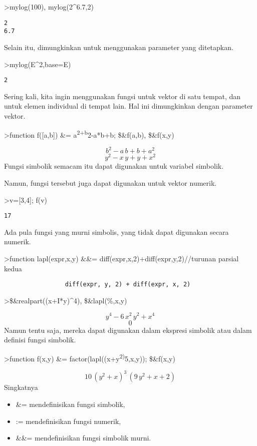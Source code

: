 \documentclass[
]{book}
\begin{document}
\textgreater mylog(100), mylog(2\^{}6.7,2)

\begin{verbatim}
2
6.7
\end{verbatim}

Selain itu, dimungkinkan untuk menggunakan parameter yang ditetapkan.

\textgreater mylog(E\^{}2,base=E)

\begin{verbatim}
2
\end{verbatim}

Sering kali, kita ingin menggunakan fungsi untuk vektor di satu tempat, dan untuk elemen individual di tempat lain. Hal ini dimungkinkan dengan parameter vektor.

\textgreater function f({[}a,b{]}) \&= a\textsuperscript{2+b}2-a*b+b; \$\&f(a,b), \$\&f(x,y)

\[b^2-a\,b+b+a^2\] \[y^2-x\,y+y+x^2\]Fungsi simbolik semacam itu dapat digunakan untuk variabel simbolik.

Namun, fungsi tersebut juga dapat digunakan untuk vektor numerik.

\textgreater v={[}3,4{]}; f(v)

\begin{verbatim}
17
\end{verbatim}

Ada pula fungsi yang murni simbolis, yang tidak dapat digunakan secara numerik.

\textgreater function lapl(expr,x,y) \&\&= diff(expr,x,2)+diff(expr,y,2)//turunan parsial kedua

\begin{verbatim}
                 diff(expr, y, 2) + diff(expr, x, 2)
\end{verbatim}

\textgreater\$\&realpart((x+I*y)\^{}4), \$\&lapl(\%,x,y)

\[y^4-6\,x^2\,y^2+x^4\] \[0\]Namun tentu saja, mereka dapat digunakan dalam ekspresi simbolik atau dalam definisi fungsi simbolik.

\textgreater function f(x,y) \&= factor(lapl((x+y\textsuperscript{2)}5,x,y)); \$\&f(x,y)

\[10\,\left(y^2+x\right)^3\,\left(9\,y^2+x+2\right)\]Singkatnya

\begin{itemize}
\item
  \&= mendefinisikan fungsi simbolik,
\item
  := mendefinisikan fungsi numerik,
\item
  \&\&= mendefinisikan fungsi simbolik murni.
\end{itemize}
\end{document}
